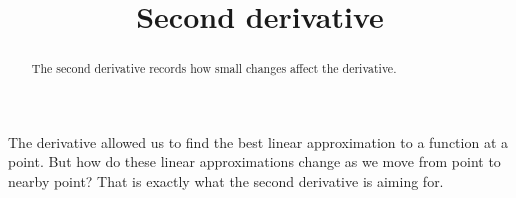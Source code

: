 \documentclass{ximera}
\title{Second derivative}
\begin{document}
\begin{abstract}
  The second derivative records how small changes affect the derivative.
\end{abstract}

The derivative allowed us to find the best linear approximation to a
function at a point.  But how do these linear approximations change as
we move from point to nearby point?  That is exactly what the second
derivative is aiming for.
\end{document}
